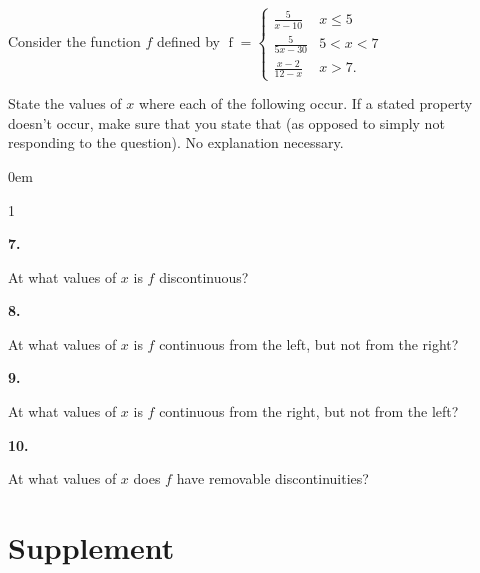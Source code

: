 \documentclass[12pt,]{book}
\newcommand{\lt}{<}
\theoremstyle{plain}
\theoremstyle{definition}
\numberwithin{equation}{section}
\newenvironment{exercisegroup}%
{\medskip\noindent}%
{\par\bigskip}%
\newlength{\exercisegroupindent}%
\newlength{\exercisegroupitemwidth}%
\newenvironment{exercisegrouplist}%
{\vspace{-\partopsep}%
\begin{adjustwidth}{\exercisegroupindent}{0em}}%
{\end{adjustwidth}%
\vspace{-\partopsep}%
\vspace{\baselineskip}}%
\newenvironment{exercisegroupbycol}[1]%
{\begin{exercisegrouplist}%
\vspace{-\multicolsep}%
\begin{multicols}{#1}%
\setlength{\parindent}{0em}%
\setlength{\exercisegroupitemwidth}{\linewidth}}%
{\end{multicols}%
\vspace{-\multicolsep}%
\end{exercisegrouplist}}%
\newenvironment{exercisegroupitem}[1]%
{\begin{minipage}[t]{\exercisegroupitemwidth}
\vspace{0pt}%
{\bfseries#1}%
\rule{0pt}{\baselineskip}}{\strut%
\end{minipage}%
\hspace{\columnsep}}%
\providecommand\phantomsection{}
\newcommand{\fe}[2]{\mathop{{#1}{\left(#2\right)}}}
\begin{document}
\begin{exercisegroup}%
Consider the function \(f\) defined by \(\fe{f}{x}=\begin{cases}\frac{5}{x-10}&x\leq5\\\frac{5}{5x-30}&5\lt x\lt7\\\frac{x-2}{12-x}&x>7\text{.}\end{cases}\)%
\par
State the values of \(x\) where each of the following occur. If a stated property doesn't occur, make sure that you state that (as opposed to simply not responding to the question). No explanation necessary.%
\par
\begin{exercisegroupbycol}{1}%
\begin{exercisegroupitem}{7. }\phantomsection\hypertarget{exercise-134}{\null}
At what values of \(x\) is \(f\) discontinuous?%
\end{exercisegroupitem}%
\par%
\begin{exercisegroupitem}{8. }\phantomsection\hypertarget{exercise-135}{\null}
At what values of \(x\) is \(f\) continuous from the left, but not from the right?%
\end{exercisegroupitem}%
\par%
\begin{exercisegroupitem}{9. }\phantomsection\hypertarget{exercise-136}{\null}
At what values of \(x\) is \(f\) continuous from the right, but not from the left?%
\end{exercisegroupitem}%
\par%
\begin{exercisegroupitem}{10. }\phantomsection\hypertarget{exercise-137}{\null}
At what values of \(x\) does \(f\) have removable discontinuities?%
\end{exercisegroupitem}%
\par%
\end{exercisegroupbycol}%
\end{exercisegroup}%
\typeout{************************************************}
\typeout{************************************************}
\section[Supplement]{Supplement}\label{limits-and-continuity-supplementary-exercises}
\typeout{************************************************}
\typeout{************************************************}
\end{document}
